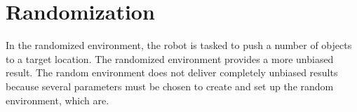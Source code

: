%
%
%
%

\section{Randomization}%
\label{sec:randomisation}
In the randomized environment, the robot is tasked to push a number of objects to a target location.  The randomized environment provides a more unbiased result. The random environment does not deliver completely unbiased results because several parameters must be chosen to create and set up the random environment, which are.\\

